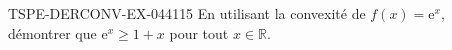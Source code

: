 \begin{exercice}{TSPE-DERCONV-EX-044}{1}{15}
En utilisant la convexité de $f(x) = \mathrm{e}^x$, démontrer que $\mathrm{e}^x \geq 1 + x$ pour tout $x \in \mathbb{R}$.

\end{exercice}
